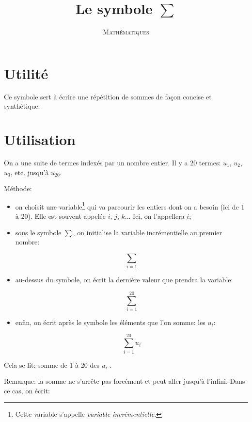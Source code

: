 \documentclass[a4paper,12pt]{scrartcl}
\date{}
\title{Le symbole $\sum$}%
\author{\textsc{Mathématiques}}
\begin{document}
\maketitle

\section{Utilité}

Ce symbole sert à écrire une répétition de sommes de façon concise et synthétique. 

\section{Utilisation}

On a une suite de termes indexés par un nombre entier. Il y a 20 termes: $u_1$, $u_2$, $u_3$, etc. jusqu'à $u_{20}$.

Méthode: 

\begin{itemize}
\item on choisit une variable\footnote{Cette variable s'appelle \emph{variable incrémentielle}.} qui va parcourir les entiers dont on a besoin (ici de 1 à 20). Elle est souvent appelée $i$, $j$, $k$... Ici, on l'appellera $i$;
\item sous le symbole $\sum$, on initialise la variable incrémentielle au premier nombre: 

\begin{equation*}
\sum_{i=1}
\end{equation*}

\item au-dessus du symbole, on écrit la dernière valeur que prendra la variable: 

\begin{equation*}
\sum_{i=1}^{20}
\end{equation*}

\item enfin, on écrit après le symbole les éléments que l'on somme: les $u_i$:

\begin{equation*}
\sum_{i=1}^{20} u_i
\end{equation*}
\end{itemize}

Cela se lit: \og somme de 1 à 20 des $u_i$ \fg{}.

Remarque: la somme ne s'arrête pas forcément et peut aller jusqu'à l'infini. Dans ce cas, on écrit:
\end{document}
